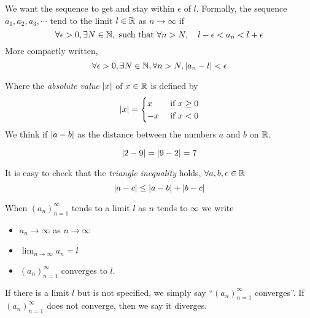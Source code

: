 \documentclass{article}
\begin{document}
We want the sequence to get and stay within $\epsilon$ of $l$. 
Formally, the sequence $a_1, a_2, a_3, \cdots$ tend to the limit $l \in \mathbb{R}$ as $n \rightarrow \infty$ if
\[
    \forall \epsilon > 0, \exists N \in \mathbb{N}, \text{ such that } \forall n > N, \quad l - \epsilon < a_n < l + \epsilon
\]
More compactly written,
\[
    \forall \epsilon > 0, \exists N \in \mathbb{N}, \forall n > N, \left\lvert a_n - l\right\rvert < \epsilon
\]

\begin{defi}
    Where the \emph{absolute value} $\left\lvert x\right\rvert$ of $x \in \mathbb{R}$ is defined by
    \[
        \left\lvert x\right\rvert = \begin{cases}
            x & \text{ if } x \geq 0 \\
            -x & \text{ if } x < 0
        \end{cases}  
    \]
    We think if $\left\lvert a - b\right\rvert$ as the distance between the numbers $a$ and $b$ on $\mathbb{R}$.
\end{defi}
\begin{eg}
    \[
        \left\lvert 2 - 9\right\rvert = \left\lvert 9 - 2\right\rvert = 7  
    \]
\end{eg}

\begin{prop}
    It is easy to check that the \emph{triangle inequality} holds, $\forall a, b, c \in \mathbb{R}$
    \[
        \left\lvert a - c\right\rvert \leq \left\lvert a - b\right\rvert + \left\lvert b - c\right\rvert  
    \]
\end{prop}

\begin{defi}
    When $(a_n)_{n=1}^\infty$ tends to a limit $l$ as $n$ tends to $\infty$ we write
    \begin{itemize}
        \item $a_n \rightarrow \infty$ as $n \rightarrow \infty$ 
        \item $\lim_{n \rightarrow \infty} a_n = l$
        \item $(a_n)_{n=1}^\infty$ converges to $l$.
    \end{itemize}
    If there is a limit $l$ but is not specified, we simply say ``$(a_n)_{n=1}^\infty$ converges''.
    If $(a_n)_{n=1}^\infty$ does not converge, then we say it diverges.
\end{defi}
\end{document}
